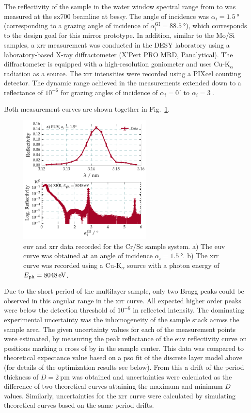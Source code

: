 The reflectivity of the sample in the water window spectral range from  to  was measured at the \gls{sx700} beamline at \gls{bessy}. The angle of incidence was $\alpha_i=\SI{1.5}{\degree}$ (corresponding to a grazing angle of incidence of $\alpha_i^\text{GI} = \SI{88.5}{\degree}$), which corresponds to the design goal for this mirror prototype. In addition, similar to the Mo/Si samples, a \gls{xrr} measurement was 
conducted in the DESY laboratory using a laboratory-based X-ray diffractometer 
(X'Pert PRO MRD, Panalytical). The diffractometer is equipped with a high-resolution goniometer and uses Cu-K$_\alpha$ radiation as a source. The \gls{xrr} intensities were recorded using a PIXcel counting detector. The dynamic range achieved in the measurements 
extended down to a reflectance of $10^{-6}$ for grazing angles of incidence of 
$\alpha_i=0^\circ$ to $\alpha_i=3^\circ$.

Both measurement curves are shown together in Fig.~\ref{ch_spec:fig_CrSc_EUV_XRR_data}.
\begin{figure}[htbp]
  \centering
  \includegraphics[width=0.6\textwidth]{img/CrSc_EUV_XRR_data}
  \caption{\Gls{euv} and \gls{xrr} data recorded for the Cr/Sc sample system. a) The \gls{euv} curve was obtained at an angle of incidence $\alpha_i=\SI{1.5}{\degree}$. b) The \gls{xrr} curve was recorded using a Cu-K$_\alpha$ source with a photon energy of $E_\text{ph}=\ev{8048}$.}
  \label{ch_spec:fig_CrSc_EUV_XRR_data}
\end{figure}
Due to the short period of the multilayer sample, only two Bragg peaks could be observed in this angular range in the \gls{xrr} curve. All expected higher order peaks were below the detection threshold of $10^{-6}$ in reflected intensity. The dominating experimental uncertainty was the inhomogeneity of the sample stack across the sample area. The given uncertainty values for each of the measurement points were estimated, by measuring the peak reflectance of the \gls{euv} reflectivity curve on positions marking a cross of  by  in the sample center. This data was compared to theoretical expectance value based on a \gls{pso} fit of the discrete layer model above (for details of the optimization results see below). From this a drift of the period thickness of $D=\SI{2}{\pico\meter}$ was obtained and uncertainties were calculated as the difference of two theoretical curves attaining the maximum and minimum $D$ values. Similarly, uncertainties for the \gls{xrr} curve were calculated by simulating theoretical curves based on the same period drifts.

